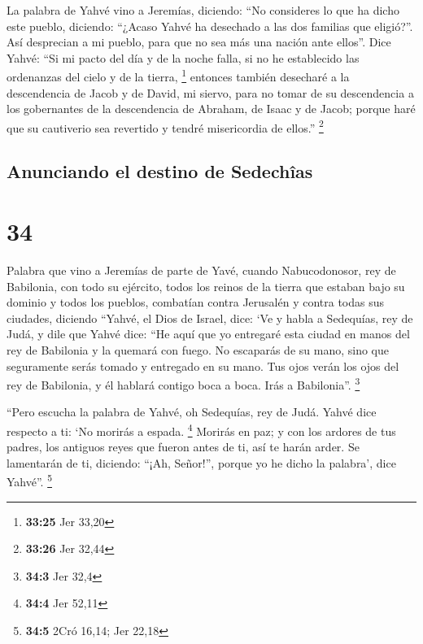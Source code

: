  La palabra de Yahvé vino a Jeremías, diciendo:
 ``No consideres lo que ha dicho este pueblo, diciendo:
``¿Acaso Yahvé ha desechado a las dos familias que eligió?''. Así
desprecian a mi pueblo, para que no sea más una nación ante ellos''.
 Dice Yahvé: ``Si mi pacto del día y de la noche falla,
si no he establecido las ordenanzas del cielo y de la tierra,
\footnote{\textbf{33:25} Jer 33,20}  entonces también
desecharé a la descendencia de Jacob y de David, mi siervo, para no
tomar de su descendencia a los gobernantes de la descendencia de
Abraham, de Isaac y de Jacob; porque haré que su cautiverio sea
revertido y tendré misericordia de ellos.'' \footnote{\textbf{33:26} Jer
  32,44}

\hypertarget{anunciando-el-destino-de-sedechuxeeas}{%
\subsection{Anunciando el destino de
Sedechîas}\label{anunciando-el-destino-de-sedechuxeeas}}

\hypertarget{section-33}{%
\section{34}\label{section-33}}

 Palabra que vino a Jeremías de parte de Yavé, cuando
Nabucodonosor, rey de Babilonia, con todo su ejército, todos los reinos
de la tierra que estaban bajo su dominio y todos los pueblos, combatían
contra Jerusalén y contra todas sus ciudades, diciendo 
``Yahvé, el Dios de Israel, dice: `Ve y habla a Sedequías, rey de Judá,
y dile que Yahvé dice: ``He aquí que yo entregaré esta ciudad en manos
del rey de Babilonia y la quemará con fuego.  No escaparás
de su mano, sino que seguramente serás tomado y entregado en su mano.
Tus ojos verán los ojos del rey de Babilonia, y él hablará contigo boca
a boca. Irás a Babilonia''. \footnote{\textbf{34:3} Jer 32,4}

 ``Pero escucha la palabra de Yahvé, oh Sedequías, rey de
Judá. Yahvé dice respecto a ti: `No morirás a espada. \footnote{\textbf{34:4}
  Jer 52,11}  Morirás en paz; y con los ardores de tus
padres, los antiguos reyes que fueron antes de ti, así te harán arder.
Se lamentarán de ti, diciendo: ``¡Ah, Señor!'', porque yo he dicho la
palabra', dice Yahvé''. \footnote{\textbf{34:5} 2Cró 16,14; Jer 22,18}

